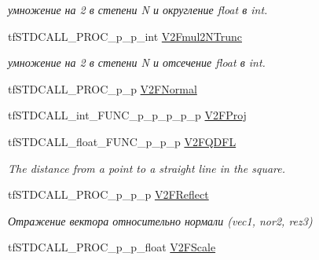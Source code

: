 \begin{DoxyCompactItemize}
\begin{DoxyCompactList}\small\item\em умножение на 2 в степени N и округление float в int. \end{DoxyCompactList}\item 
\hypertarget{structs_functions_vector_c_p_u_a0434c47c04e1bb66ed5c6b7069131e3f}{tf\-S\-T\-D\-C\-A\-L\-L\-\_\-\-P\-R\-O\-C\-\_\-p\-\_\-p\-\_\-int \hyperlink{structs_functions_vector_c_p_u_a0434c47c04e1bb66ed5c6b7069131e3f}{V2\-Fmul2\-N\-Trunc}}\label{structs_functions_vector_c_p_u_a0434c47c04e1bb66ed5c6b7069131e3f}

\begin{DoxyCompactList}\small\item\em умножение на 2 в степени N и отсечение float в int. \end{DoxyCompactList}\item 
tf\-S\-T\-D\-C\-A\-L\-L\-\_\-\-P\-R\-O\-C\-\_\-p\-\_\-p \hyperlink{structs_functions_vector_c_p_u_acc6cccced6dc99a9cbbc23681418e6e2}{V2\-F\-Normal}
\item 
tf\-S\-T\-D\-C\-A\-L\-L\-\_\-int\-\_\-\-F\-U\-N\-C\-\_\-p\-\_\-p\-\_\-p\-\_\-p\-\_\-p \hyperlink{structs_functions_vector_c_p_u_a0adaec36d623d19b1fdcff4fd6e5fd8d}{V2\-F\-Proj}
\item 
\hypertarget{structs_functions_vector_c_p_u_a7c8bf89a4236226db3ccddee38d9ee90}{tf\-S\-T\-D\-C\-A\-L\-L\-\_\-float\-\_\-\-F\-U\-N\-C\-\_\-p\-\_\-p\-\_\-p \hyperlink{structs_functions_vector_c_p_u_a7c8bf89a4236226db3ccddee38d9ee90}{V2\-F\-Q\-D\-F\-L}}\label{structs_functions_vector_c_p_u_a7c8bf89a4236226db3ccddee38d9ee90}

\begin{DoxyCompactList}\small\item\em The distance from a point to a straight line in the square. \end{DoxyCompactList}\item 
\hypertarget{structs_functions_vector_c_p_u_af61a31ce34864645f88face7cae63fd3}{tf\-S\-T\-D\-C\-A\-L\-L\-\_\-\-P\-R\-O\-C\-\_\-p\-\_\-p\-\_\-p \hyperlink{structs_functions_vector_c_p_u_af61a31ce34864645f88face7cae63fd3}{V2\-F\-Reflect}}\label{structs_functions_vector_c_p_u_af61a31ce34864645f88face7cae63fd3}

\begin{DoxyCompactList}\small\item\em Отражение вектора относительно нормали (vec1, nor2, rez3) \end{DoxyCompactList}\item 
\hypertarget{structs_functions_vector_c_p_u_a0a281aee11ecc5d8bbd309f86b2a9dec}{tf\-S\-T\-D\-C\-A\-L\-L\-\_\-\-P\-R\-O\-C\-\_\-p\-\_\-p\-\_\-float \hyperlink{structs_functions_vector_c_p_u_a0a281aee11ecc5d8bbd309f86b2a9dec}{V2\-F\-Scale}}\label{structs_functions_vector_c_p_u_a0a281aee11ecc5d8bbd309f86b2a9dec}


\end{DoxyCompactItemize}
